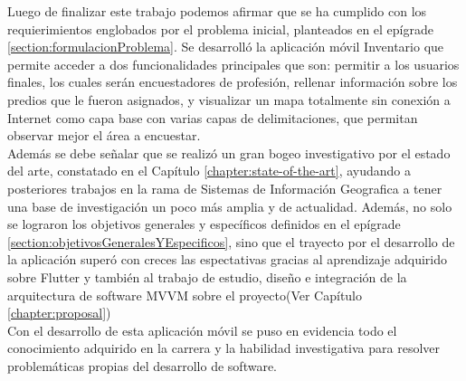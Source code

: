\begin{conclusions}
    Luego de finalizar este trabajo podemos afirmar que se ha cumplido con los requierimientos englobados por el problema inicial, planteados
    en el epígrade \ref{section:formulacionProblema}. Se desarrolló la aplicación móvil Inventario que permite acceder a dos funcionalidades principales que son: permitir
    a los usuarios finales, los cuales serán encuestadores de profesión, rellenar información sobre los predios que le fueron asignados, y
    visualizar un mapa totalmente sin conexión a Internet como capa base con varias capas de delimitaciones, que permitan observar mejor el área a encuestar.\\
    Además se debe señalar que se realizó un gran bogeo investigativo por el estado del arte, constatado en el Capítulo \ref{chapter:state-of-the-art},
    ayudando a posteriores trabajos en la rama de Sistemas de Información Geografica a tener una base de investigación un poco más amplia y de actualidad. Además, no solo se lograron
    los objetivos generales y específicos definidos en el epígrade \ref{section:objetivosGeneralesYEspecificos}, sino que el trayecto por el desarrollo de la aplicación superó con creces las espectativas
    gracias al aprendizaje adquirido sobre Flutter y también al trabajo de estudio, diseño e integración de la arquitectura de software MVVM sobre el proyecto(Ver Capítulo \ref{chapter:proposal})\\
    Con el desarrollo de esta aplicación móvil se puso en evidencia todo el conocimiento
    adquirido en la carrera y la habilidad investigativa para resolver problemáticas propias
    del desarrollo de software.

\end{conclusions}
